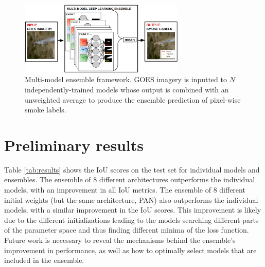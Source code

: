 \documentclass{article}
\begin{document}
\begin{figure}
    \centering
    \includegraphics[width=0.7\textwidth]{ensemble_framework.png}
    \caption{\RaggedRight Multi-model ensemble framework. GOES imagery is inputted to $N$ independently-trained models whose output is combined with an unweighted average to produce the ensemble prediction of pixel-wise smoke labels.}
    \label{fig:ensemble_framework}
\end{figure}
\section{Preliminary results}
Table \ref{tab:results} shows the IoU scores on the test set for individual models and ensembles. The ensemble of 8 different architectures outperforms the individual models, with an improvement in all IoU metrics. The ensemble of 8 different initial weights (but the same architecture, PAN) also outperforms the individual models, with a similar improvement in the IoU scores. This improvement is likely due to the different initializations leading to the models searching different parts of the parameter space and thus finding different minima of the loss function. Future work is necessary to reveal the mechanisms behind the ensemble's improvement in performance, as well as how to optimally select models that are included in the ensemble.
\end{document}
